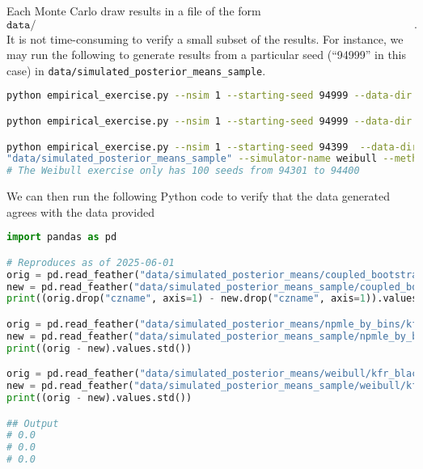 \documentclass[10pt]{article}
\begin{document}
Each Monte Carlo draw results in a file of the form \[
  \texttt{data/simulated\_posterior\_means/[SimulatorName]/[VariableName]/[Seed].feather}.
\]
It is not time-consuming to verify a small subset of the results. For instance, we may run
the following to generate results from a particular seed (``94999'' in this case) in 
\texttt{data/simulated\_posterior\_means\_sample}. 

\begin{lstlisting}[language=bash]
python empirical_exercise.py --nsim 1 --starting-seed 94999 --data-dir "data/simulated_posterior_means_sample" --simulator-name npmle_by_bins --methods all --est_var kfr_black_pooled_p25

python empirical_exercise.py --nsim 1 --starting-seed 94999 --data-dir "data/simulated_posterior_means_sample" --simulator-name coupled_bootstrap-0.9 --methods all --est_var kfr_black_pooled_p25

python empirical_exercise.py --nsim 1 --starting-seed 94399  --data-dir
"data/simulated_posterior_means_sample" --simulator-name weibull --methods indep_gauss,close_npmle,close_gauss,close_gauss_parametric  --est_var kfr_black_pooled_p25 
# The Weibull exercise only has 100 seeds from 94301 to 94400
\end{lstlisting}

We can then run the following Python code to verify that the data generated agrees with
the data provided

\begin{lstlisting}[language=Python]
import pandas as pd

# Reproduces as of 2025-06-01
orig = pd.read_feather("data/simulated_posterior_means/coupled_bootstrap-0.9/kfr_black_pooled_p25/94999.feather")
new = pd.read_feather("data/simulated_posterior_means_sample/coupled_bootstrap-0.9/kfr_black_pooled_p25/94999.feather")
print((orig.drop("czname", axis=1) - new.drop("czname", axis=1)).values.std())

orig = pd.read_feather("data/simulated_posterior_means/npmle_by_bins/kfr_black_pooled_p25/94999.feather")
new = pd.read_feather("data/simulated_posterior_means_sample/npmle_by_bins/kfr_black_pooled_p25/94999.feather")
print((orig - new).values.std())

orig = pd.read_feather("data/simulated_posterior_means/weibull/kfr_black_pooled_p25/94399.feather")
new = pd.read_feather("data/simulated_posterior_means_sample/weibull/kfr_black_pooled_p25/94399.feather")
print((orig - new).values.std())

## Output
# 0.0
# 0.0
# 0.0
\end{lstlisting}
\end{document}

